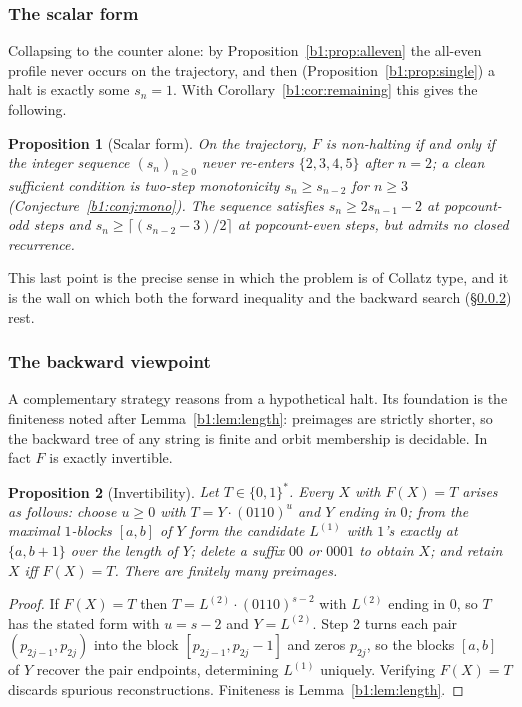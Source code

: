 \documentclass[a4paper]{article}
\theoremstyle{plain}
\newtheorem{proposition}{Proposition}[subsection]
\theoremstyle{definition}
\theoremstyle{remark}
\begin{document}
\subsubsection{The scalar form}\label{b1:sec:10.4}
Collapsing to the counter alone: by Proposition~\ref{b1:prop:alleven} the all-even profile never occurs on the trajectory, and then (Proposition~\ref{b1:prop:single}) a halt is exactly some $s_n=1$. With Corollary~\ref{b1:cor:remaining} this gives the following.

\begin{proposition}[Scalar form]\label{b1:prop:scalar}
On the trajectory, $F$ is non-halting if and only if the integer sequence $(s_n)_{n\ge 0}$ never re-enters $\{2,3,4,5\}$ after $n=2$; a clean sufficient condition is two-step monotonicity $s_n\ge s_{n-2}$ for $n\ge 3$ (Conjecture~\ref{b1:conj:mono}). The sequence satisfies $s_n\ge 2s_{n-1}-2$ at popcount-odd steps and $s_n\ge\lceil(s_{n-2}-3)/2\rceil$ at popcount-even steps, but admits no closed recurrence.
\end{proposition}

This last point is the precise sense in which the problem is of Collatz type, and it is the wall on which both the forward inequality and the backward search (\S\ref{b1:sec:backward}) rest.

\subsubsection{The backward viewpoint}\label{b1:sec:backward}
A complementary strategy reasons from a hypothetical halt. Its foundation is the finiteness noted after Lemma~\ref{b1:lem:length}: preimages are strictly shorter, so the backward tree of any string is finite and orbit membership is decidable. In fact $F$ is exactly invertible.

\begin{proposition}[Invertibility]\label{b1:prop:inv}
Let $T\in\{0,1\}^*$. Every $X$ with $F(X)=T$ arises as follows: choose $u\ge 0$ with $T=Y\cdot(0110)^u$ and $Y$ ending in $0$; from the maximal $1$-blocks $[a,b]$ of $Y$ form the candidate $L^{(1)}$ with $1$'s exactly at $\{a,b+1\}$ over the length of $Y$; delete a suffix $00$ or $0001$ to obtain $X$; and retain $X$ iff $F(X)=T$. There are finitely many preimages.
\end{proposition}
\begin{proof}
If $F(X)=T$ then $T=L^{(2)}\cdot(0110)^{s-2}$ with $L^{(2)}$ ending in $0$, so $T$ has the stated form with $u=s-2$ and $Y=L^{(2)}$. Step 2 turns each pair $(p_{2j-1},p_{2j})$ into the block $[p_{2j-1},p_{2j}-1]$ and zeros $p_{2j}$, so the blocks $[a,b]$ of $Y$ recover the pair endpoints, determining $L^{(1)}$ uniquely. Verifying $F(X)=T$ discards spurious reconstructions. Finiteness is Lemma~\ref{b1:lem:length}.
\end{proof}
\end{document}
